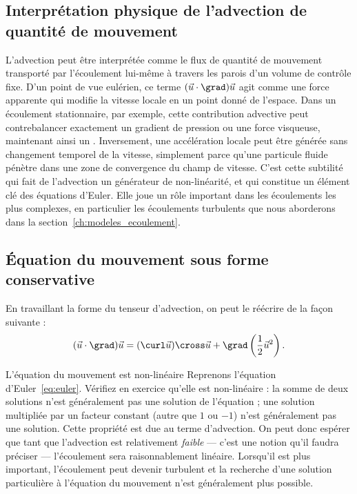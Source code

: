 \subsection{Interprétation physique de l'advection de quantité de mouvement}
L'advection peut être interprétée comme le flux de quantité de mouvement transporté par l'écoulement lui-même à travers les parois d'un volume de contrôle fixe. D'un point de vue eulérien, ce terme $(\vec{u} \cdot \grad)\vec{u}$ agit comme une force apparente qui modifie la vitesse locale en un point donné de l'espace. Dans un écoulement stationnaire, par exemple, cette contribution advective peut contrebalancer exactement un gradient de pression ou une force visqueuse, maintenant ainsi un . Inversement, une accélération locale peut être générée sans changement temporel de la vitesse, simplement parce qu'une particule fluide pénètre dans une zone de convergence du champ de vitesse. C'est cette subtilité qui fait de l'advection un générateur de non-linéarité, et qui constitue un élément clé des équations d'Euler. Elle joue un rôle important dans les écoulements les plus complexes, en particulier les écoulements turbulents que nous aborderons dans la section~\ref{ch:modeles_ecoulement}.

\subsection{Équation du mouvement sous forme conservative}
En travaillant la forme du tenseur d'advection, on peut le réécrire de la façon suivante \cite{acheson01aa} :
\begin{equation}
  (\vec{u} \cdot \grad)\vec{u} = (\curl \vec{u}) \cross \vec{u} + \grad\left(\frac{1}{2} \vec{u}^2\right).
  \label{eq:euler_conserv}
\end{equation}

\begin{studentinvestigation}{L'équation du mouvement est non-linéaire}
Reprenons l'équation d'Euler~\eqref{eq:euler}. Vérifiez en exercice qu'elle est non-linéaire : la somme de deux solutions n'est généralement pas une solution de l'équation ; une solution multipliée par un facteur constant (autre que $1$ ou $-1$) n'est généralement pas une solution.
Cette propriété est due au terme d'advection. On peut donc espérer que tant que l'advection est relativement \emph{faible} --- c'est une notion qu'il faudra préciser --- l'écoulement sera raisonnablement linéaire. Lorsqu'il est plus important, l'écoulement peut devenir turbulent  et la recherche d'une solution particulière à l'équation du mouvement n'est généralement plus possible.
\end{studentinvestigation}

